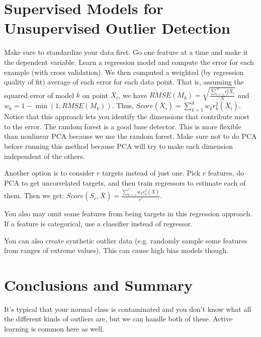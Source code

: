 \documentclass[a4paper]{article}
\begin{document}
\section{Supervised Models for Unsupervised Outlier Detection}
Make sure to standardize your data first.
Go one feature at a time and make it the dependent variable. Learn a regression
model and compute the error for each example (with cross validation). We then
computed a weighted (by regression quality of fit) average of each error for
each data point. That is, assuming the squared error of model $k$ on point
$\bar{X}_i$, we have $RMSE(M_k) =
\sqrt{\frac{\sum_{i=1}^{N}{\epsilon_{k}^{2}{\bar{X}_i}}}{N}}$ and $w_k
= 1 - \min{(1, RMSE(M_{k}))}$. Thus, $Score(\bar{X}_i) = \sum_{k=1}^{d}{
w_k \epsilon_k^2(\bar{X}_i)}$. Notice that this approach lets you identify
the dimensions that contribute most to the error. The random forest is a good
base detector. This is more flexible than nonlinear PCA because we use the
random forest. Make sure not to do PCA before running this method because PCA
will try to make each dimension independent of the others.

Another option is to consider $r$ targets instead of just one. Pick $r$
features, do PCA to get uncorrelated targets, and then train regressors to
estimate each of them. Then we get: $Score(S_r, \bar{X}) = \frac{
\sum_{k=1}^{r'}{w_k \epsilon_k^2(\bar{X})}}{r'}$.

You also may omit some features from being targets in this regression approach.
If a feature is categorical, use a classifier instead of regressor.

You can also create synthetic outlier data (e.g. randomly sample some features
from ranges of extreme values). This can cause high bias models though.

\section{Conclusions and Summary}
It's typical that your normal class is contaminated and you don't know what all
the different kinds of outliers are, but we can handle both of these. Active
learning is common here as well.
\end{document}
